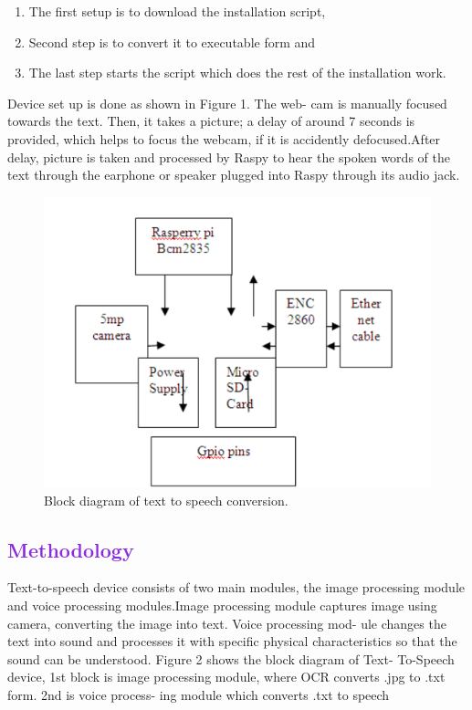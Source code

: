 \documentclass[a4paper]{article}
\begin{document}
\begin{enumerate}
    \item The first setup is to download the installation script,
    \item Second step is to convert it to executable form and
    \item The last step starts the script which does the rest of the installation work.
\end{enumerate}
Device set up is done as shown in Figure 1. The web- cam is manually focused towards the text. Then, it takes a picture; a delay of around 7 seconds is provided, which helps to focus the webcam, if it is accidently defocused.After delay, picture is taken and processed by Raspy to hear the spoken words of the text through the earphone or speaker plugged into Raspy through its audio jack.

\vspace{5mm}
\begin{figure}[h]
    \centering
    \includegraphics[scale = 0.8]{img1.png}
    \caption{Block diagram of text to speech conversion.}
    \label{fig:enter-label}
\end{figure}

\textcolor{BlueViolet}
{\section{Methodology}}
\small
Text-to-speech device consists of two main modules, the image processing module and voice processing modules.Image processing module captures image using camera, converting the image into text. Voice processing mod- ule changes the text into sound and processes it with specific physical characteristics so that the sound can be understood. Figure 2 shows the block diagram of Text- To-Speech device, 1st block is image processing module, where OCR converts .jpg to .txt form. 2nd is voice process- ing module which converts .txt to speech
\end{document}
